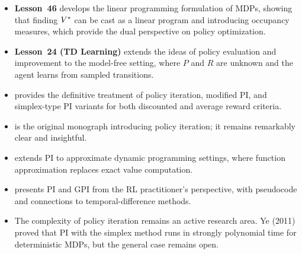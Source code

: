 \documentclass[11pt,a4paper]{article}
\begin{document}
\begin{itemize}
    \item \textbf{Lesson~46} develops the linear programming
    formulation of MDPs, showing that finding $V^*$ can be cast
    as a linear program and introducing occupancy measures, which
    provide the dual perspective on policy optimization.
    \item \textbf{Lesson~24 (TD Learning)} extends the ideas of
    policy evaluation and improvement to the model-free setting,
    where $P$ and $R$ are unknown and the agent learns from
    sampled transitions.
    \item \citet[Chapters 6--7]{puterman2014} provides the
    definitive treatment of policy iteration, modified PI,
    and simplex-type PI variants for both discounted and
    average reward criteria.
    \item \citet{howard1960} is the original monograph introducing
    policy iteration; it remains remarkably clear and insightful.
    \item \citet[Chapter 2]{bertsekas2012} extends PI to
    approximate dynamic programming settings, where function
    approximation replaces exact value computation.
    \item \citet[Chapter 4]{suttonbarto2018} presents PI and GPI
    from the RL practitioner's perspective, with pseudocode and
    connections to temporal-difference methods.
    \item The complexity of policy iteration remains an active
    research area. Ye (2011) proved that PI with the simplex method
    runs in strongly polynomial time for deterministic MDPs, but
    the general case remains open.
\end{itemize}


\end{document}
